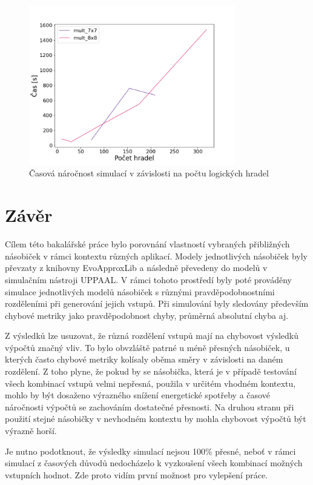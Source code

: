 \begin{figure}[H]
    \centering
    \includegraphics[width=0.8\textwidth]{obrazky-figures/scalability_time.png}
    \caption{Časová náročnost simulací v závislosti na počtu logických hradel}
    \label{fig:scalability_time}
\end{figure}

\chapter{Závěr}
\label{zaver}
Cílem této bakalářské práce bylo porovnání vlastností vybraných přibližných násobiček v rámci kontextu různých aplikací. Modely jednotlivých násobiček byly převzaty z knihovny EvoApproxLib \cite{circuit_library} a následně převedeny do modelů v simulačním nástroji UPPAAL. V rámci tohoto prostředí byly poté prováděny simulace jednotlivých modelů násobiček s různými pravděpodobnostními rozděleními při generování jejich vstupů. Při simulování byly sledovány především chybové metriky jako pravděpodobnost chyby, průměrná absolutní chyba aj.

Z výsledků lze usuzovat, že různá rozdělení vstupů mají na chybovost výsledků výpočtů značný vliv. To bylo obvzláště patrné u méně přesných násobiček, u kterých často chybové metriky kolísaly oběma směry v závislosti na daném rozdělení. Z toho plyne, že pokud by se násobička, která je v případě testování všech kombinací vstupů velmi nepřesná, použila v určitém vhodném kontextu, mohlo by být dosaženo výrazného snížení energetické spotřeby a časové náročnosti výpočtů se zachováním dostatečné přesnosti. Na druhou stranu při použití stejné násobičky v nevhodném kontextu by mohla chybovost výpočtů být výrazně horší.

Je nutno podotknout, že výsledky simulací nejsou 100\% přesné, neboť v rámci simulací z časových důvodů nedocházelo k vyzkoušení všech kombinací možných vstupních hodnot. Zde proto vidím první možnost pro vylepšení práce.

